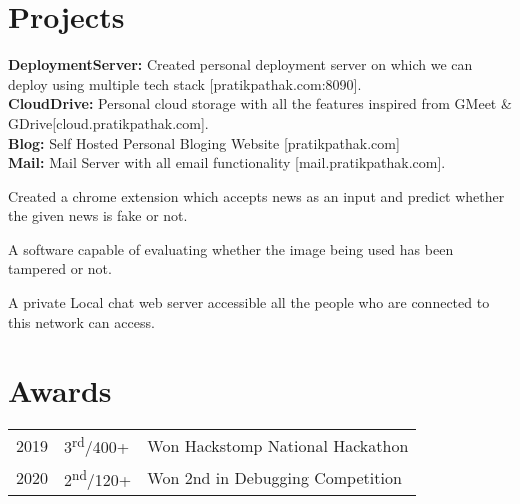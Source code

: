 \documentclass[]{Resume}
\begin{document}
\begin{minipage}[t]{0.66\textwidth}

\section{Projects}
\location{}
\textbf{DeploymentServer:} Created personal deployment server on which we can deploy using multiple tech stack [pratikpathak.com:8090].\\
\textbf{CloudDrive:} Personal cloud storage with all the features inspired from GMeet \& GDrive[cloud.pratikpathak.com].\\
\textbf{Blog:} Self Hosted Personal Bloging Website [pratikpathak.com]\\
\textbf{Mail:} Mail Server with all email functionality [mail.pratikpathak.com].
\sectionsep

\location{}
Created a chrome extension which accepts news as an input and predict whether the given news is fake or not.
\sectionsep

\location{}
A software capable of evaluating whether the image being used has been tampered or not.
\sectionsep

\location{}
A private Local chat web server accessible all the people who are connected to this network can access.
\sectionsep


\section{Awards} 
\begin{tabular}{rll}
2019	     & 3\textsuperscript{rd}/400+   & Won Hackstomp National Hackathon\\
2020	     & 2\textsuperscript{nd}/120+   & Won 2nd in Debugging Competition\\
\end{tabular}
\sectionsep

\end{minipage} 
\end{document}
